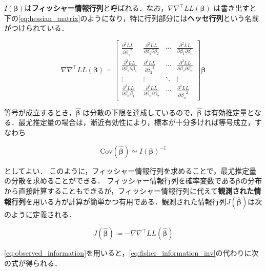 $I(\bm\beta)$は\textbf{フィッシャー情報行列}と呼ばれる．なお，$\nabla\nabla^\top LL(\bm\beta)$ は書き出すと下の\eqref{eq:hessian_matrix}のようになり，特に行列部分には\textbf{ヘッセ行列}という名前がつけられている．

\begin{equation}
    \label{eq:hessian_matrix}
    \nabla\nabla^\top LL(\bm\beta) = \begin{bmatrix}
        \frac{\partial^2 LL}{\partial {\beta_1}^2}              & \frac{\partial^2 LL}{\partial \beta_1 \partial \beta_2} & \cdots & \frac{\partial^2 LL}{\partial \beta_1 \partial \beta_n}  \\
        \frac{\partial^2 LL}{\partial \beta_2 \partial \beta_1} & \frac{\partial^2 LL}{\partial {\beta_2}^2}              & \cdots & \frac{\partial^2 LL}{\partial \beta_2 \partial \beta_n } \\
        \vdots                                                  & \vdots                                                  & \ddots & \vdots                                                   \\
        \frac{\partial^2 LL}{\partial \beta_n \beta_1}          & \frac{\partial^2 LL}{\partial \beta_n \partial \beta_2} & \cdots & \frac{\partial^2 LL}{\partial {\beta_n}^2}
    \end{bmatrix} \bm\beta
\end{equation}

等号が成立するとき，$\bm{\hat\beta}$ は分散の下限を達成しているので，$\bm{\hat\beta}$ は有効推定量となる．最尤推定量の場合は，漸近有効性により，標本が十分多ければ等号成立，すなわち

\begin{equation}
    \label{eq:fisher_information_inv}
    \mathrm{Cov}(\bm{\hat\beta}) \simeq I(\bm\beta)^{-1}
\end{equation}

としてよい．
このように，フィッシャー情報行列を求めることで，最尤推定量の分散を求めることができる．
フィッシャー情報行列を確率変数である$\bm\beta$の分布から直接計算することもできるが，フィッシャー情報行列に代えて\textbf{観測された情報行列}を用いる方が計算が簡単かつ有用である．観測された情報行列$J(\bm{\hat\beta})$は次のように定義される．

\begin{equation}
    \label{eq:observed_information}
    J(\bm{\hat\beta}) \coloneqq -\nabla\nabla^\top LL(\bm{\hat\beta})
\end{equation}

\eqref{eq:observed_information}を用いると，\eqref{eq:fisher_information_inv}の代わりに次の式が得られる．

